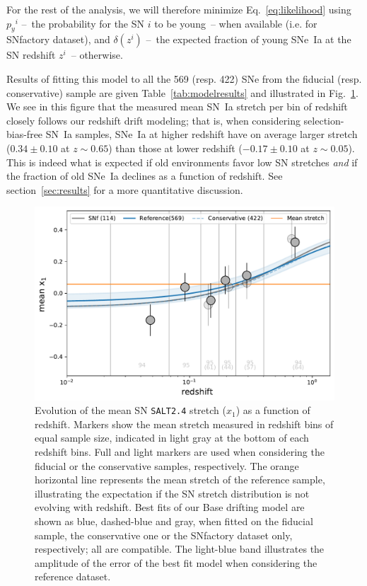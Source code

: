 \documentclass[]{aa} %
\begin{document}
For the rest of the analysis, we will therefore minimize Eq.~\ref{eq:likelihood}
using $p_y{}^i$ --~the probability for the SN $i$ to be young~-- when available
(i.e. for SNfactory dataset), and $\delta(z^{i})$ --~the expected fraction of
young SNe~Ia at the SN redshift $z^{i}$~-- otherwise.

Results of fitting this model to all the 569 (resp. 422) SNe from the fiducial
(resp. conservative) sample are given Table~\ref{tab:modelresults} and
illustrated in Fig.~\ref{fig:modelall}. We see in this figure that the measured
mean SN~Ia stretch per bin of redshift closely follows our redshift drift
modeling; that is, when considering selection-bias-free SN~Ia samples, SNe~Ia at
higher redshift have on average larger stretch ($0.34 \pm 0.10$ at $z\sim0.65$)
than those at lower redshift ($-0.17\pm 0.10$ at $z\sim0.05$). This is indeed
what is expected if old environments favor low SN stretches
\citep[e.g.][]{howell2007} \emph{and} if the fraction of old SNe~Ia declines as
a function of redshift. See section~\ref{sec:results} for a more quantitative
discussion.

\begin{figure}
    \centering
    \includegraphics[width=0.7\linewidth]{Article_figures/stretchevol_all_vs_snf.pdf}
    \caption{Evolution of the mean SN \textsc{\texttt{SALT2.4}} stretch ($x_1$)
        as a function of redshift. Markers show the mean stretch measured in
        redshift bins of equal sample size, indicated in light gray at the
        bottom of each redshift bins. Full and light markers are used when
        considering the fiducial or the conservative samples, respectively. The
        orange horizontal line represents the mean stretch of the reference
        sample, illustrating the expectation if the SN stretch distribution is
        not evolving with redshift. Best fits of our Base drifting model are
        shown as blue, dashed-blue and gray, when fitted on the fiducial sample,
        the conservative one or the SNfactory dataset only, respectively; all
        are compatible. The light-blue band illustrates the amplitude of the
    error of the best fit model when considering the reference dataset.}
    \label{fig:modelall}
\end{figure}
\end{document}
